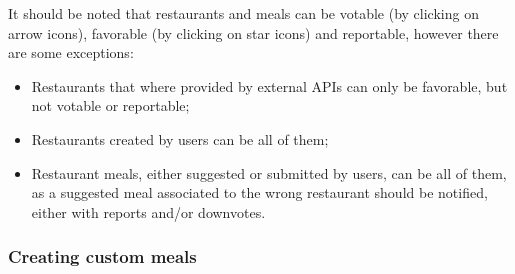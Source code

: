 It should be noted that restaurants and meals can be votable (by clicking on arrow icons),
favorable (by clicking on star icons) and reportable, however there are some exceptions:
\begin{itemize}
    \item Restaurants that where provided by external APIs can only be favorable, but not votable or reportable;
    \item Restaurants created by users can be all of them;
    \item Restaurant meals, either suggested or submitted by users, can be all of them, as a suggested meal associated to the 
    wrong restaurant should be notified, either with reports and/or downvotes.
\end{itemize}

\subsubsection{Creating custom meals}


